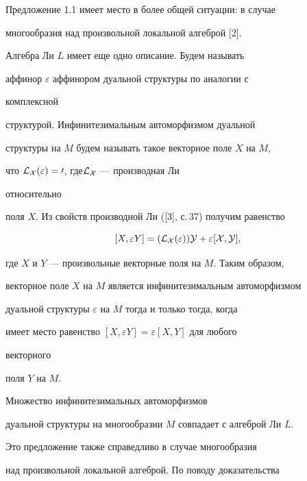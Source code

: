  


Предложение 1.1 имеет место в более общей ситуации: в случае 


многообразия над произвольной локальной алгеброй [2]. 


 


Алгебра Ли $L$ имеет еще одно описание. Будем называть 


аффинор $\varepsilon$ аффинором дуальной структуры по аналогии с 


комплексной 


структурой. Инфинитезимальным автоморфизмом дуальной 


структуры на $M$ будем называть такое векторное поле $X$ на $M$, 


что $\cal L_X(\varepsilon)=0$, где\linebreak $\cal L_X$ --- производная Ли 


относительно 


поля $X$. Из свойств производной Ли ([3], с.\,37) получим равенство 


$$ 


[X,\varepsilon Y]=(\cal L_X(\varepsilon))Y+\varepsilon[X,Y], 


$$ 


где $X$ и $Y$ --- произвольные векторные поля на $M$. Таким образом, 


векторное поле $X$ на $M$ является инфинитезимальным автоморфизмом 


дуальной структуры $\varepsilon$ на $M$ тогда и только тогда, когда 


имеет место равенство $[X,\varepsilon Y]=\varepsilon[X,Y]$ для любого 


векторного 


поля $Y$ на $M$. 


 


\begin{props} 


Множество инфинитезимальных автоморфизмов 


дуальной структуры на многообразии $M$ совпадает с алгеброй Ли $L$. 


\end{props} 


 


Это предложение также справедливо в случае многообразия 


над произвольной локальной алгеброй. По поводу доказательства 


